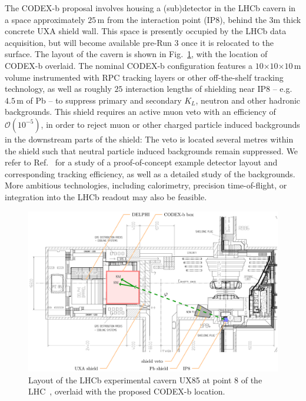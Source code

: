 The CODEX-b proposal involves housing a (sub)detector in the LHCb cavern in a space approximately $25$\,m from the interaction point (IP8), behind the 3m thick concrete UXA shield wall. This space is presently occupied by the LHCb data acquisition, but will become available pre-Run 3 once it is relocated to the surface. The layout of the cavern is shown in Fig.~\ref{fig:LHCbCav}, with the location of CODEX-b overlaid. 
The nominal CODEX-b configuration features a $10$$\times10$$\times10$\,m volume instrumented with RPC tracking layers or other off-the-shelf tracking technology, as well as roughly $25$ interaction lengths of shielding near IP8 -- e.g. $4.5$\,m of Pb --  to suppress primary and secondary $K_L$, neutron and other hadronic backgrounds. This shield requires an active muon veto with an efficiency of $\mathcal{O}(10^{-5})$, in order to reject muon or other charged particle induced backgrounds in the downstream parts of the shield: The veto is located several metres within the shield such that neutral particle induced backgrounds remain suppressed. We refer to Ref.~\cite{Gligorov:2017nwh} for a study of a proof-of-concept  example detector layout and corresponding tracking efficiency, as well as a detailed study of the backgrounds.
More ambitious technologies, including calorimetry, precision time-of-flight, or integration into the LHCb readout may also be feasible.

\begin{figure}[t]\centering
	\includegraphics[width = 0.75\linewidth]{plots/LHCbCavern}
	\caption{Layout of the LHCb experimental cavern UX85 at point 8 of the LHC~\cite{cavern}, overlaid with the proposed CODEX-b location.} 
	\label{fig:LHCbCav}
\end{figure}

